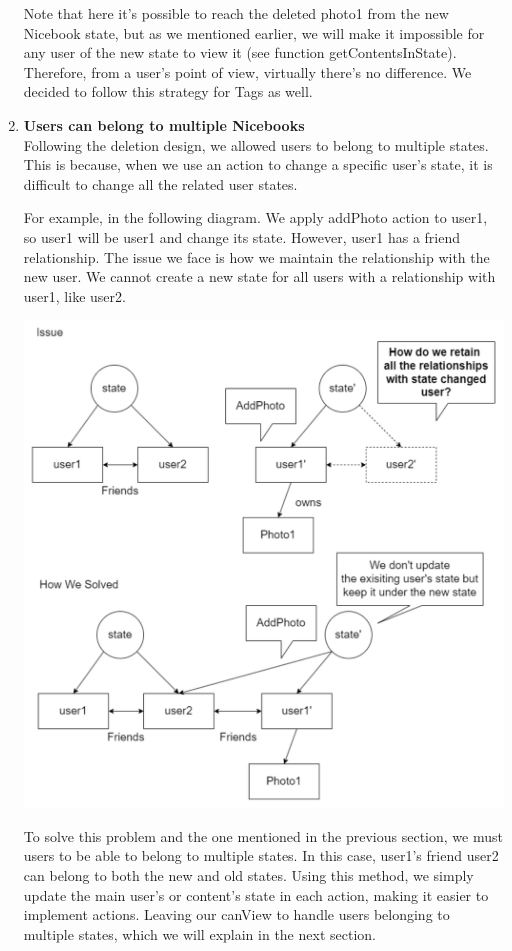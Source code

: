 \documentclass[titlepage]{article}
\begin{document}
\begin{enumerate}
	      Note that here it’s possible to reach the deleted photo1 from the new Nicebook state, but as we mentioned earlier, we will make it impossible for any user of the new state to view it (see function getContentsInState). Therefore, from a user’s point of view, virtually there’s no difference. We decided to follow this strategy for Tags as well.

	\item \textbf{Users can belong to multiple Nicebooks}\\
	      Following the deletion design, we allowed users to belong to multiple states. This is because, when we use an action to change a specific user’s state, it is difficult to change all the related user states.

	      For example, in the following diagram. We apply addPhoto action to user1, so user1 will be user1 and change its state. However, user1 has a friend relationship. The issue we face is how we maintain the relationship with the new user. We cannot create a new state for all users with a relationship with user1, like user2.

	      \includegraphics[width=6in]{images/multiple_nicebooks.png}

	      To solve this problem and the one mentioned in the previous section, we must users to be able to belong to multiple states. In this case, user1’s friend user2 can belong to both the new and old states. Using this method, we simply update the main user’s or content’s state in each action, making it easier to implement actions. Leaving our canView to handle users belonging to multiple states, which we will explain in the next section.


\end{enumerate}
\end{document}
